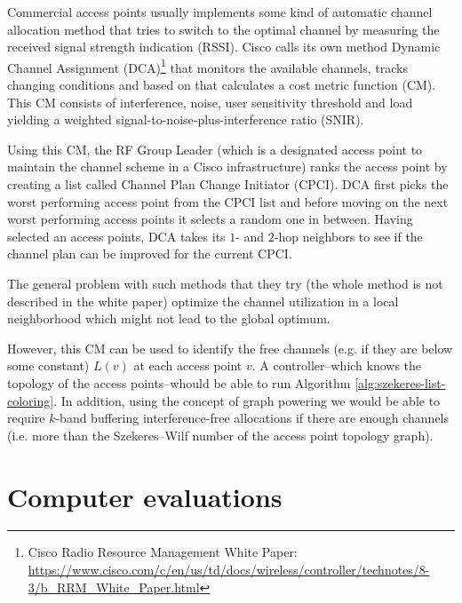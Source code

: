 \documentclass[a4paper, 12pt]{article}
\begin{document}
Commercial access points usually implements some kind of automatic channel allocation method that tries to switch to the optimal channel by measuring the received signal strength indication (RSSI). Cisco calls its own method Dynamic Channel Assignment (DCA)\footnote{Cisco Radio Resource Management White Paper: \url{https://www.cisco.com/c/en/us/td/docs/wireless/controller/technotes/8-3/b_RRM_White_Paper.html}} that monitors the available channels, tracks changing conditions and based on that calculates a cost metric function (CM). This CM consists of interference, noise, user sensitivity threshold and load yielding a weighted signal-to-noise-plus-interference ratio (SNIR).

Using this CM, the RF Group Leader (which is a designated access point to maintain the channel scheme in a Cisco infrastructure) ranks the access point by creating a list called Channel Plan Change Initiator (CPCI). DCA first picks the worst performing access point from the CPCI list and before moving on the next worst performing access points it selects a random one in between. Having selected an access points, DCA takes its $1$- and $2$-hop neighbors to see if the channel plan can be improved for the current CPCI.

The general problem with such methods that they try (the whole method is not described in the white paper) optimize the channel utilization in a local neighborhood which might not lead to the global optimum.

However, this CM can be used to identify the free channels (e.g. if they are below some constant) $L(v)$ at each access point $v$. A controller\---which knows the topology of the access points\---whould be able to run Algorithm \ref{alg:szekeres-list-coloring}. In addition, using the concept of graph powering we would be able to require $k$-band buffering interference-free allocations if there are enough channels (i.e. more than the Szekeres\---Wilf number of the access point topology graph).
\section{Computer evaluations}\label{sec:eval}
\end{document}
